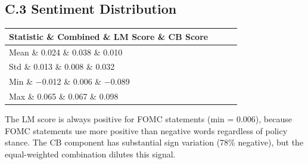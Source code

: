 \documentclass[12pt]{article}
\begin{document}
\subsection{C.3 Sentiment Distribution}

\begin{table}[htbp]
\centering
\begin{tabular}{lccc}
\toprule
Statistic \& Combined \& LM Score \& CB Score \\
\midrule
Mean \& 0.024 \& 0.038 \& 0.010 \\
Std \& 0.013 \& 0.008 \& 0.032 \\
Min \& $-$0.012 \& 0.006 \& $-$0.089 \\
Max \& 0.065 \& 0.067 \& 0.098 \\
\bottomrule
\end{tabular}
\end{table}

The LM score is always positive for FOMC statements (min = 0.006), because FOMC statements use more positive than negative words regardless of policy stance. The CB component has substantial sign variation (78\% negative), but the equal-weighted combination dilutes this signal.
\end{document}
